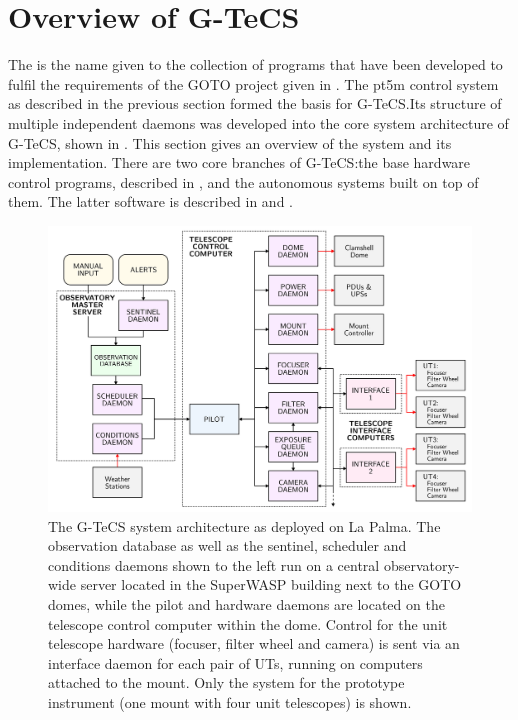 
\section{Overview of G-TeCS}
\label{sec:gtecs}


\begin{colsection}

The  is the name given to the collection of programs that have been developed to fulfil the requirements of the GOTO project given in . The pt5m control system as described in the previous section formed the basis for G-TeCS.\@ Its structure of multiple independent daemons was developed into the core system architecture of G-TeCS, shown in . This section gives an overview of the system and its implementation. There are two core branches of G-TeCS:\@ the base hardware control programs, described in , and the autonomous systems built on top of them. The latter software is described in  and .

\begin{figure}[p]
    \begin{center}
        \includegraphics[width=\linewidth]{images/flow.pdf}
    \end{center}
    \caption[The G-TeCS system architecture]{
        The G-TeCS system architecture as deployed on La Palma. The observation database as well as the sentinel, scheduler and conditions daemons shown to the left run on a central observatory-wide server located in the SuperWASP building next to the GOTO domes, while the pilot and hardware daemons are located on the telescope control computer within the dome. Control for the unit telescope hardware (focuser, filter wheel and camera) is sent via an interface daemon for each pair of UTs, running on computers attached to the mount. Only the system for the prototype instrument (one mount with four unit telescopes) is shown.
    }\label{fig:flow}
\end{figure}

\end{colsection}

